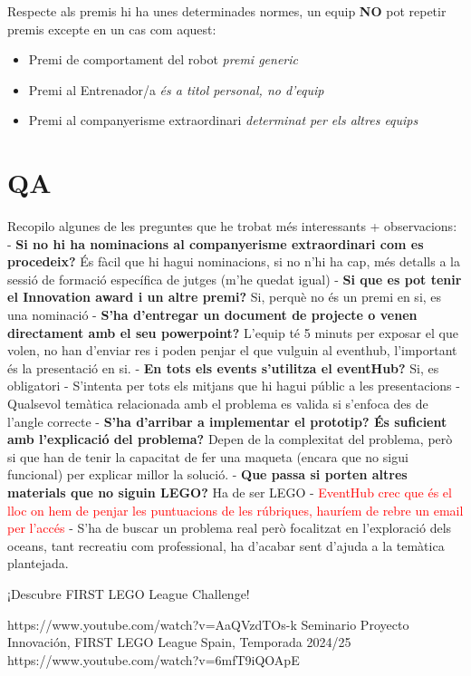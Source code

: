 \documentclass{article}
\newcommand\dubtes[1]{\textcolor{red}{#1}}
\begin{document}
Respecte als premis hi ha unes determinades normes, un equip \textbf{NO} pot repetir premis excepte en un cas com aquest:

\begin{itemize}
    \item Premi de comportament del robot \textit{premi generic}
    \item Premi al Entrenador/a \textit{és a titol personal, no d'equip}
    \item Premi al companyerisme extraordinari \textit{determinat per els altres equips}
\end{itemize}


\section{QA}

Recopilo algunes de les preguntes que he trobat més interessants + observacions:
\hfill \break\hfill \break
- \textbf{Si no hi ha nominacions al companyerisme extraordinari com es procedeix?} És fàcil que hi hagui nominacions, si no n'hi ha cap, més detalls a la sessió de formació específica de jutges (m’he quedat igual)
\hfill \break\hfill \break
- \textbf{Si que es pot tenir el Innovation award i un altre premi?} Si, perquè no és un premi en si, es una nominació
\hfill \break\hfill \break
- \textbf{S’ha d’entregar un document de projecte o venen directament amb el seu powerpoint?} L’equip té 5 minuts per exposar el que volen, no han d’enviar res i poden penjar el que vulguin al eventhub, l'important és la presentació en si.
\hfill \break\hfill \break
- \textbf{En tots els events s’utilitza el eventHub?} Si, es obligatori
\hfill \break\hfill \break
- S’intenta per tots els mitjans que hi hagui públic a les presentacions
\hfill \break\hfill \break
- Qualsevol temàtica relacionada amb el problema es valida si s’enfoca des de l’angle correcte
\hfill \break\hfill \break
- \textbf{S’ha d’arribar a implementar el prototip? És suficient amb l’explicació del problema?} Depen de la complexitat del problema, però si que han de tenir la capacitat de fer una maqueta (encara que no sigui funcional) per explicar millor la solució.
\hfill \break\hfill \break
- \textbf{Que passa si porten altres materials que no siguin LEGO?} Ha de ser LEGO
\hfill \break\hfill \break
- \dubtes{EventHub crec que és el lloc on hem de penjar les puntuacions de les rúbriques, hauríem de rebre un email per l’accés}
\hfill \break\hfill \break
- S’ha de buscar un problema real però focalitzat en l’exploració dels oceans, tant recreatiu com professional, ha d’acabar sent d’ajuda a la temàtica plantejada.


\begin{thebibliography}{9}

¡Descubre FIRST LEGO League Challenge!

https://www.youtube.com/watch?v=AaQVzdTOs-k
Seminario Proyecto Innovación, FIRST LEGO League Spain, Temporada 2024/25  
https://www.youtube.com/watch?v=6mfT9iQOApE

\end{thebibliography}
\end{document}
